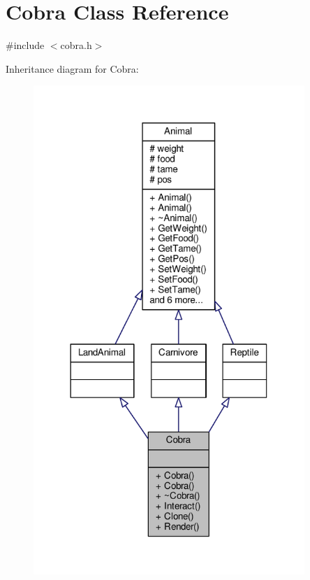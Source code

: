 \hypertarget{classCobra}{}\section{Cobra Class Reference}
\label{classCobra}


{\ttfamily \#include $<$cobra.\+h$>$}



Inheritance diagram for Cobra\+:
\nopagebreak
\begin{figure}[H]
\begin{center}
\leavevmode
\includegraphics[width=291pt]{classCobra__inherit__graph}
\end{center}
\end{figure}



